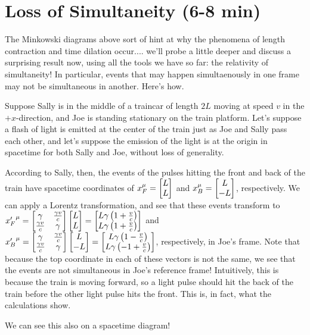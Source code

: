 \documentclass[12pt]{scrartcl}
\begin{document}
\section{Loss of Simultaneity (6-8 min)}
The Minkowski diagrams above sort of hint at why the phenomena of length contraction and time dilation occur.... we'll probe a little deeper and discuss a surprising result now, using all the tools we have so far: the relativity of simultaneity! In particular, events that may happen simultaenously in one frame may not be simultaneous in another. Here's how.

Suppose Sally is in the middle of a traincar of length $2L$ moving at speed $v$ in the $+x$-direction, and Joe is standing stationary on the train platform. Let's suppose a flash of light is emitted at the center of the train just as Joe and Sally pass each other, and let's suppose the emission of the light is at the origin in spacetime for both Sally and Joe, without loss of generality.

According to Sally, then, the events of the pulses hitting the front and back of the train have spacetime coordinates of $x_F^\mu = \begin{bmatrix}L \\ L\end{bmatrix}$ and $x_B^\mu = \begin{bmatrix}L \\ -L\end{bmatrix}$, respectively. We can apply a Lorentz transformation, and see that these events transform to ${x'_F}^\mu = \begin{bmatrix}\gamma & \frac{\gamma v}{c} \\ \frac{\gamma v}{c} & \gamma\end{bmatrix}  \begin{bmatrix}L \\ L\end{bmatrix} =
	\begin{bmatrix}L\gamma\left(1+\frac{v}{c}\right) \\ L\gamma\left(1+\frac{v}{c}\right)\end{bmatrix}$ and
${x'_B}^\mu = \begin{bmatrix}\gamma & \frac{\gamma v}{c} \\ \frac{\gamma v}{c} & \gamma\end{bmatrix}  \begin{bmatrix}L \\ -L\end{bmatrix} = \begin{bmatrix}L\gamma\left(1-\frac{v}{c}\right) \\ L\gamma\left(-1+\frac{v}{c}\right)\end{bmatrix}$, respectively, in Joe's frame. Note that because the top coordinate in each of these vectors is not the same, we see that the events are not simultaneous in Joe's reference frame! Intuitively, this is because the train is moving forward, so a light pulse should hit the back of the train  before the other light pulse hits the front. This is, in fact, what the calculations show.

We can see this also on a spacetime diagram!
\end{document}

